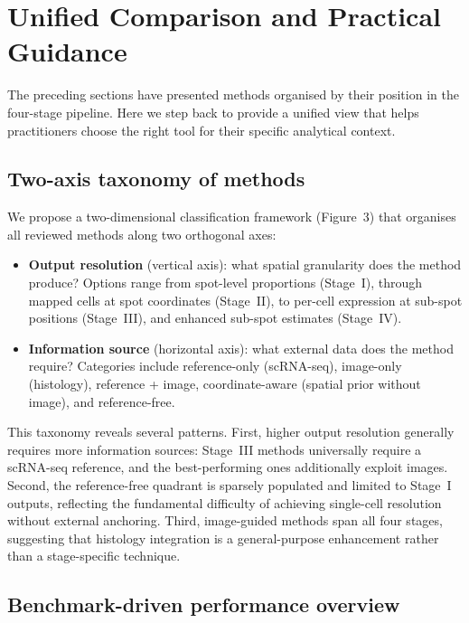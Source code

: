 \section{Unified Comparison and Practical Guidance}
\label{sec:comparison}

The preceding sections have presented methods organised by their position in the four-stage pipeline. Here we step back to provide a unified view that helps practitioners choose the right tool for their specific analytical context.

\subsection{Two-axis taxonomy of methods}

We propose a two-dimensional classification framework (Figure~3) that organises all reviewed methods along two orthogonal axes:

\begin{itemize}
  \item \textbf{Output resolution} (vertical axis): what spatial granularity does the method produce? Options range from spot-level proportions (Stage~I), through mapped cells at spot coordinates (Stage~II), to per-cell expression at sub-spot positions (Stage~III), and enhanced sub-spot estimates (Stage~IV).
  \item \textbf{Information source} (horizontal axis): what external data does the method require? Categories include reference-only (scRNA-seq), image-only (histology), reference + image, coordinate-aware (spatial prior without image), and reference-free.
\end{itemize}

This taxonomy reveals several patterns. First, higher output resolution generally requires more information sources: Stage~III methods universally require a scRNA-seq reference, and the best-performing ones additionally exploit images. Second, the reference-free quadrant is sparsely populated and limited to Stage~I outputs, reflecting the fundamental difficulty of achieving single-cell resolution without external anchoring. Third, image-guided methods span all four stages, suggesting that histology integration is a general-purpose enhancement rather than a stage-specific technique.

\subsection{Benchmark-driven performance overview}

